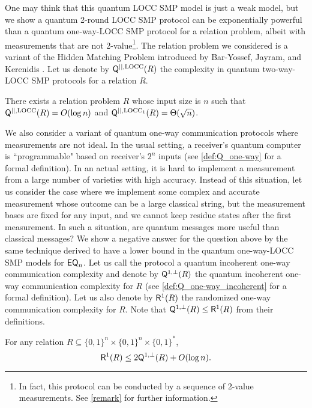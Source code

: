 One may think that this quantum LOCC SMP model is just a weak model, but we show a quantum 2-round LOCC SMP protocol can be exponentially powerful than a quantum one-way-LOCC SMP protocol for a relation problem, albeit with measurements that are not 2-value\footnote{In fact, this protocol can be conducted by a sequence of 2-value measurements. See \cref{remark} for further information.}. The relation problem we considered is a variant of the Hidden Matching Problem introduced by Bar-Yossef, Jayram, and Kerenidis \cite{BYJK08}. 
Let us denote by $\mathsf{Q}^{||,\mathrm{LOCC}}(R)$ the complexity in quantum two-way-LOCC SMP protocols for a relation $R$.

\begin{proposition}
    There exists a relation problem $R$ whose input size is $n$ such that $\mathsf{Q}^{||,\mathrm{LOCC}}(R) = O(\log n)$ and $\mathsf{Q}^{||,\mathrm{LOCC}_1}(R) = \Theta(\sqrt{n})$.
\end{proposition}

We also consider a variant of quantum one-way communication protocols where measurements are not ideal. In the usual setting, a receiver's quantum computer is ``programmable" based on receiver's $2^n$ inputs (see \cref{def:Q_one-way} for a formal definition). In an actual setting, it is hard to implement a measurement from a large number of varieties with high accuracy. Instead of this situation, let us consider the case where we implement some complex and accurate measurement whose outcome can be a large classical string, but the measurement bases are fixed for any input, and we cannot keep residue states after the first measurement. In such a situation, are quantum messages more useful than classical messages? We show a negative answer for the question above by the same technique derived to have a lower bound in the quantum one-way-LOCC SMP models for $\mathsf{EQ}_n$. Let us call the protocol a quantum incoherent one-way communication complexity and denote by $\mathsf{Q}^{1,\perp}(R)$ the quantum incoherent one-way communication complexity for $R$ (see \cref{def:Q_one-way_incoherent} for a formal definition). Let us also denote by $\mathsf{R}^1(R)$ the randomized one-way communication complexity for $R$. Note that $\mathsf{Q}^{1,\perp}(R) \leq \mathsf{R}^1(R)$ from their definitions.

\begin{corollary}\label{cor:incoherent_intro}
    For any relation $R \subseteq \{0,1\}^n \times \{0,1\}^n \times \{0,1\}^*$, 
    \[
    \mathsf{R}^1(R) \leq 2 \mathsf{Q}^{1,\perp}(R) + O(\log n).
    \]
\end{corollary}

